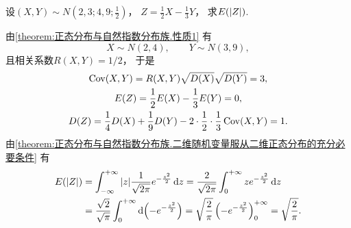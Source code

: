 \begin{example}
设\((X,Y) \sim N\left(2,3;4,9;\frac{1}{2}\right)\)，
\(Z = \frac{1}{2} X - \frac{1}{3} Y\)，
求\(E(\abs{Z})\).
\begin{solution}
由\cref{theorem:正态分布与自然指数分布族.性质1} 有\begin{equation*}
	X \sim N(2,4), \qquad
	Y \sim N(3,9),
\end{equation*}且相关系数\(R(X,Y) = 1/2\)，
于是\begin{gather*}
	\operatorname{Cov}(X,Y) = R(X,Y) \sqrt{D(X)} \sqrt{D(Y)} = 3, \\
	E(Z) = \frac{1}{2} E(X) - \frac{1}{3} E(Y) = 0, \\
	D(Z) = \frac{1}{4} D(X) + \frac{1}{9} D(Y)
		- 2 \cdot \frac{1}{2} \cdot \frac{1}{3} \operatorname{Cov}(X,Y)
	= 1.
\end{gather*}
由\cref{theorem:正态分布与自然指数分布族.二维随机变量服从二维正态分布的充分必要条件}
有\begin{align*}
	E(\abs{Z})
	&= \int_{-\infty}^{+\infty} \abs{z} \frac{1}{\sqrt{2\pi}} e^{-\frac{z^2}{2}} \dd{z}
	= \frac{2}{\sqrt{2\pi}} \int_0^{+\infty} z e^{-\frac{z^2}{2}} \dd{z} \\
	&= \frac{\sqrt{2}}{\sqrt{\pi}} \int_0^{+\infty} \dd(-e^{-\frac{z^2}{2}})
	= \sqrt{\frac{2}{\pi}} \left(-e^{-\frac{z^2}{2}}\right)_0^{+\infty}
	= \sqrt{\frac{2}{\pi}}.
\end{align*}
\end{solution}
\end{example}

